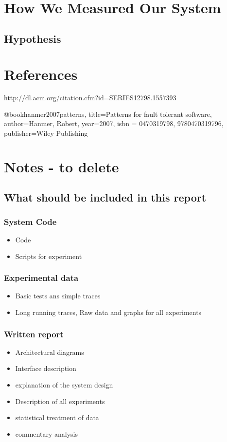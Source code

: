 \documentclass[a4paper]{article}
\begin{document}
\section{How We Measured Our System}



\subsection{Hypothesis}

\section{References}


http://dl.acm.org/citation.cfm?id=SERIES12798.1557393

@book{hanmer2007patterns,
  title={Patterns for fault tolerant software},
  author={Hanmer, Robert},
  year={2007},
  isbn = {0470319798, 9780470319796},
  publisher={Wiley Publishing}
}

%

\section{Notes - to delete}

\subsection{What should be included in this report }

\subsubsection{System Code}
\begin{itemize}
\item Code
\item Scripts for experiment
\end{itemize}

\subsubsection{Experimental data}
\begin{itemize}
\item Basic tests ans simple traces
\item Long running traces, Raw data and graphs for all experiments
\end{itemize}

\subsubsection{Written report}
\begin{itemize}
\item Architectural  diagrams
\item Interface description
\item explanation of the system design
\item Description of all experiments
\item statistical treatment of data
\item commentary analysis
\end{itemize}
\end{document}
